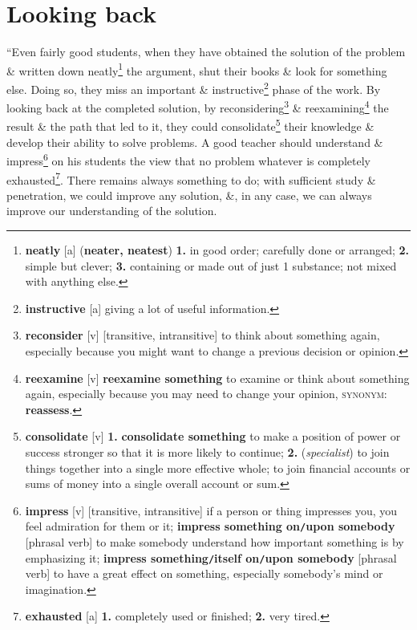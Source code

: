 \documentclass[oneside]{book}
\numberwithin{equation}{section}
\begin{document}
\section{Looking back}
``Even fairly good students, when they have obtained the solution of the problem \& written down neatly\footnote{\textbf{neatly} [a] (\textbf{neater, neatest}) \textbf{1.} in good order; carefully done or arranged; \textbf{2.} simple but clever; \textbf{3.} containing or made out of just 1 substance; not mixed with anything else.} the argument, shut their books \& look for something else. Doing so, they miss an important \& instructive\footnote{\textbf{instructive} [a] giving a lot of useful information.} phase of the work. By looking back at the completed solution, by reconsidering\footnote{\textbf{reconsider} [v] [transitive, intransitive] to think about something again, especially because you might want to change a previous decision or opinion.} \& reexamining\footnote{\textbf{reexamine} [v] \textbf{reexamine something} to examine or think about something again, especially because you may need to change your opinion, \textsc{synonym}: \textbf{reassess}.} the result \& the path that led to it, they could consolidate\footnote{\textbf{consolidate} [v] \textbf{1.} \textbf{consolidate something} to make a position of power or success stronger so that it is more likely to continue; \textbf{2.} (\textit{specialist}) to join things together into a single more effective whole; to join financial accounts or sums of money into a single overall account or sum.} their knowledge \& develop their ability to solve problems. A good teacher should understand \& impress\footnote{\textbf{impress} [v] [transitive, intransitive] if a person or thing impresses you, you feel admiration for them or it; \textbf{impress something on\texttt{/}upon somebody} [phrasal verb] to make somebody understand how important something is by emphasizing it; \textbf{impress something\texttt{/}itself on\texttt{/}upon somebody} [phrasal verb] to have a great effect on something, especially somebody's mind or imagination.} on his students the view that no problem whatever is completely exhausted\footnote{\textbf{exhausted} [a] \textbf{1.} completely used or finished; \textbf{2.} very tired.}. There remains always something to do; with sufficient study \& penetration, we could improve any solution, \&, in any case, we can always improve our understanding of the solution.
\end{document}
